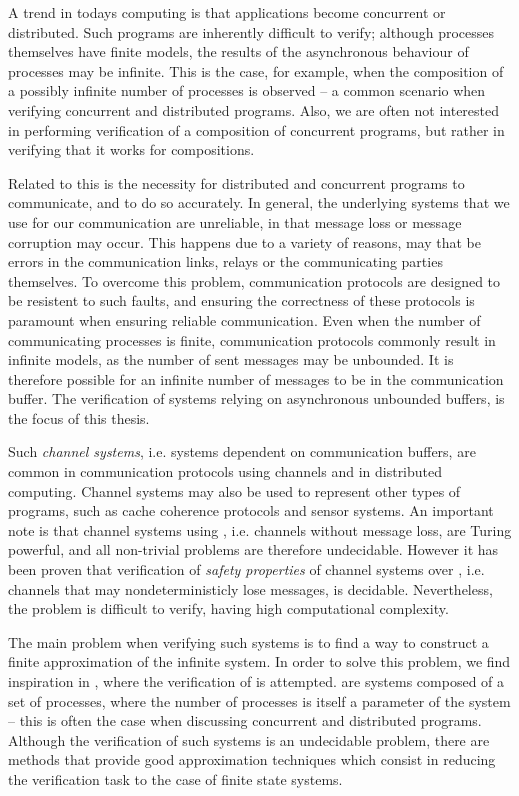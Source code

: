 A trend in todays computing is that applications become concurrent or distributed. Such programs are inherently difficult to verify; although processes themselves have finite models, the results of the asynchronous behaviour of processes may be infinite. This is the case, for example, when the composition of a possibly infinite number of processes is observed -- a common scenario when verifying concurrent and distributed programs. Also, we are often not interested in performing verification of a  composition of concurrent programs, but rather in verifying that it works for  compositions.

Related to this is the necessity for distributed and concurrent programs to communicate, and to do so accurately. In general, the underlying systems that we use for our communication are unreliable, in that message loss or message corruption may occur. This happens due to a variety of reasons, may that be errors in the communication links, relays or the communicating parties themselves. To overcome this problem, communication protocols are designed to be resistent to such faults, and ensuring the correctness of these protocols is paramount when ensuring reliable communication. Even when the number of communicating processes is finite, communication protocols commonly result in infinite models, as the number of sent messages may be unbounded. It is therefore possible for an infinite number of messages to be in the communication buffer. The verification of systems relying on asynchronous unbounded buffers, is the focus of this thesis.

Such \emph{channel systems}, i.e. systems dependent on communication buffers, are common in communication protocols using channels and in distributed computing\cite{fredlund2007mcerlang}. Channel systems may also be used to represent other types of programs, such as cache coherence protocols and sensor systems\cite{zuck2004}. An important note is that channel systems using , i.e. channels without message loss, are Turing powerful, and all non-trivial problems are therefore undecidable. However it has been proven that verification of \emph{safety properties} of channel systems over , i.e. channels that may nondeterministicly lose messages, is decidable\cite{287591}\cite{gordon}. Nevertheless, the problem is difficult to verify, having high computational complexity.

The main problem when verifying such systems is to find a way to construct a finite approximation of the infinite system. In order to solve this problem, we find inspiration in \cite{parosh}, where the verification of  is attempted.  are systems composed of a set of processes, where the number of processes is itself a parameter of the system -- this is often the case when discussing concurrent and distributed programs. Although the verification of such systems is an undecidable problem, there are methods that provide good approximation techniques which consist in reducing the verification task to the case of finite state systems.

